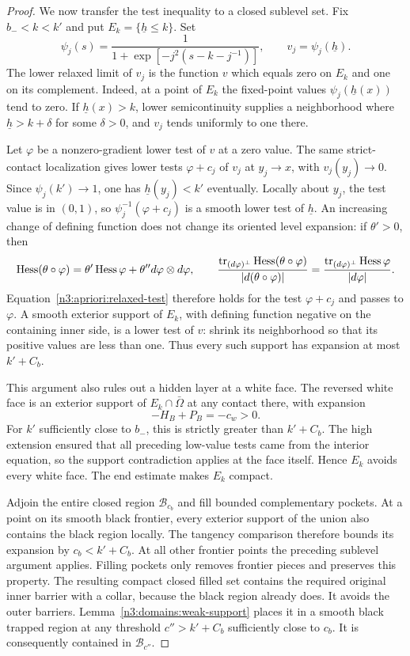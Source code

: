 \begin{proof}
We now transfer the test inequality to a closed sublevel set.
Fix $b_-<k<k'$ and put $E_k=\{\underline h\le k\}$.  Set
\begin{equation}
 \psi_j(s)=\frac{1}{1+\exp[-j^2(s-k-j^{-1})]},
 \qquad v_j=\psi_j(\underline h).
 \label{n3:apriori:sigmoid}
\end{equation}
The lower relaxed limit of $v_j$ is the function $v$ which equals
zero on $E_k$ and one on its complement.  Indeed, at a point of
$E_k$ the fixed-point values $\psi_j(\underline h(x))$ tend to zero.
If $\underline h(x)>k$, lower semicontinuity supplies a neighborhood
where $\underline h>k+\delta$ for some $\delta>0$, and $v_j$ tends
uniformly to one there.

Let $\varphi$ be a nonzero-gradient lower test of $v$ at a zero value.
The same strict-contact localization gives lower tests
$\varphi+c_j$ of $v_j$ at $y_j\to x$, with $v_j(y_j)\to0$.
Since $\psi_j(k')\to1$, one has $\underline h(y_j)<k'$ eventually.
Locally about $y_j$, the test value is in $(0,1)$, so
$\psi_j^{-1}(\varphi+c_j)$ is a smooth lower test of $\underline h$.
An increasing change of defining function does not change its
oriented level expansion: if $\theta'>0$, then
\[
 \operatorname{Hess}(\theta\circ\varphi)
 =\theta'\operatorname{Hess}\varphi+\theta''d\varphi\otimes d\varphi,
 \qquad
 \frac{\operatorname{tr}_{(d\varphi)^\perp}\operatorname{Hess}(\theta\circ\varphi)}
 {|d(\theta\circ\varphi)|}
 =\frac{\operatorname{tr}_{(d\varphi)^\perp}\operatorname{Hess}\varphi}{|d\varphi|}.
\]
Equation~\eqref{n3:apriori:relaxed-test} therefore holds for the test
$\varphi+c_j$ and passes to $\varphi$.  A smooth exterior support of
$E_k$, with defining function negative on the containing inner side,
is a lower test of $v$: shrink its neighborhood so that its positive
values are less than one.  Thus every such support has expansion
at most $k'+C_b$.

This argument also rules out a hidden layer at a white face.
The reversed white face is an exterior support of $E_k\cap\bar\Omega$
at any contact there, with expansion
\[
 -H_B+P_B=-c_w>0.
\]
For $k'$ sufficiently close to $b_-$, this is strictly greater than
$k'+C_b$.  The high extension ensured that all preceding low-value
tests came from the interior equation, so the support contradiction
applies at the face itself.  Hence $E_k$ avoids every white face.
The end estimate makes $E_k$ compact.

Adjoin the entire closed region $\mathcal B_{c_b}$ and fill bounded
complementary pockets.  At a point on its smooth black frontier,
every exterior support of the union also contains the black region
locally.  The tangency comparison therefore bounds its expansion by
$c_b<k'+C_b$.  At all other frontier points the preceding sublevel
argument applies.  Filling pockets only removes frontier pieces and
preserves this property.  The resulting compact closed filled set
contains the required original inner barrier with a collar, because
the black region already does.  It avoids the outer barriers.
Lemma~\ref{n3:domains:weak-support} places it in a smooth black trapped
region at any threshold $c''>k'+C_b$ sufficiently close to $c_b$.
It is consequently contained in $\mathcal B_{c''}$.


\end{proof}
